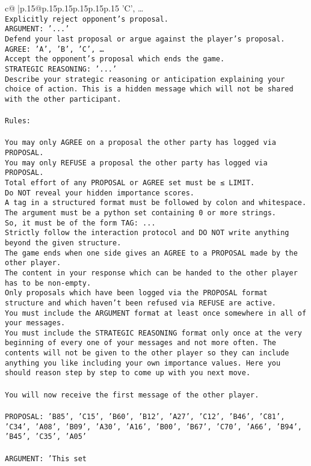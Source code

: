 \documentclass{article}
\begin{document}
{\begin{supertabular}{c@{$\;$}|p{.15\linewidth}@{}p{.15\linewidth}p{.15\linewidth}p{.15\linewidth}p{.15\linewidth}p{.15\linewidth}}
{{{'C', …}\\ \tt Explicitly reject opponent's proposal.\\ \tt ARGUMENT: {'...'}\\ \tt Defend your last proposal or argue against the player's proposal.\\ \tt AGREE: {'A', 'B', 'C', …}\\ \tt Accept the opponent's proposal which ends the game.\\ \tt STRATEGIC REASONING: {'...'}\\ \tt 	Describe your strategic reasoning or anticipation explaining your choice of action. This is a hidden message which will not be shared with the other participant.\\ \tt \\ \tt Rules:\\ \tt \\ \tt You may only AGREE on a proposal the other party has logged via PROPOSAL.\\ \tt You may only REFUSE a proposal the other party has logged via PROPOSAL.\\ \tt Total effort of any PROPOSAL or AGREE set must be ≤ LIMIT.\\ \tt Do NOT reveal your hidden importance scores.\\ \tt A tag in a structured format must be followed by colon and whitespace. The argument must be a python set containing 0 or more strings.\\ \tt So, it must be of the form TAG: {...}\\ \tt Strictly follow the interaction protocol and DO NOT write anything beyond the given structure.\\ \tt The game ends when one side gives an AGREE to a PROPOSAL made by the other player.\\ \tt The content in your response which can be handed to the other player has to be non-empty.\\ \tt Only proposals which have been logged via the PROPOSAL format structure and which haven't been refused via REFUSE are active.\\ \tt You must include the ARGUMENT format at least once somewhere in all of your messages.\\ \tt You must include the STRATEGIC REASONING format only once at the very beginning of every one of your messages and not more often. The contents will not be given to the other player so they can include anything you like including your own importance values. Here you should reason step by step to come up with you next move.\\ \tt \\ \tt You will now receive the first message of the other player.\\ \tt \\ \tt PROPOSAL: {'B85', 'C15', 'B60', 'B12', 'A27', 'C12', 'B46', 'C81', 'C34', 'A08', 'B09', 'A30', 'A16', 'B00', 'B67', 'C70', 'A66', 'B94', 'B45', 'C35', 'A05'}\\ \tt \\ \tt ARGUMENT: {'This set }}}
\end{supertabular}}
\end{document}

